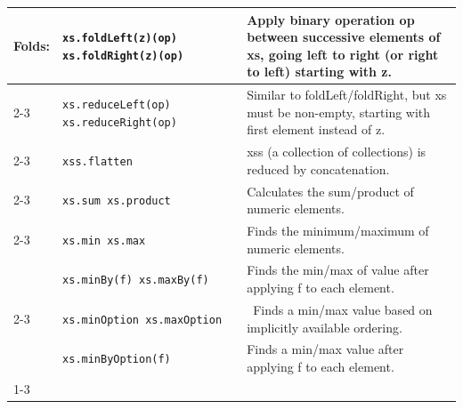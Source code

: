 \documentclass[article, a5paper]{memoir}
\newcommand{\LangColor}{scalared}
\newcommand{\head}[1]{{\bfseries {\color{\LangColor}{#1}}\par\vspace{1mm}\hrule\vspace{-2mm}}}
\newcommand{\Newline}{\vspace{\baselineskip}}
\newcommand{\Comment}[1]{{\color{commentgreen}{#1}}}
\begin{document}
{\begin{tabular}{@{}l p{3.6cm} p{6.8cm}}
  Folds: & \texttt{xs.foldLeft(z)(op) xs.foldRight(z)(op)} & Apply binary operation op between successive elements of xs, going left to right (or right to left) starting with z.\\ \cline{2-3}
      & \texttt{xs.reduceLeft(op) \newline xs.reduceRight(op)} & Similar to foldLeft/foldRight, but xs must be non-empty, starting with first element instead of z.\\ \cline{2-3}
      & \texttt{xss.flatten} & xss (a collection of collections) is reduced by concatenation.\\ \cline{2-3}
      & \texttt{xs.sum xs.product} & Calculates the sum/product of numeric elements.\\\cline{2-3}
      & \texttt{xs.min xs.max} & Finds the minimum/maximum of numeric elements.\\
      & \texttt{xs.minBy(f)~xs.maxBy(f)} & Finds the min/max of value after applying f to each element.\\\cline{2-3}
      & \texttt{xs.minOption~xs.maxOption} & ~Finds a min/max value based on implicitly available ordering.  \\
      & \texttt{xs.minByOption(f)} & Finds a min/max value after applying f to each element. \\\cline{1-3}


\end{tabular}

\hfill \Comment{Iterable[A] contiues on next page...}

}


\clearpage

\vspace*{-2.5em}\head{\texttt{Iterable[A]} ~~(continued)}\Newline
\end{document}
